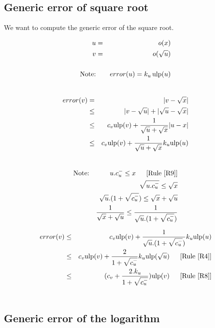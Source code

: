 \documentclass[12pt]{amsart}
\def\ulp{{\rm ulp}}
\newcommand{\U}[1]{\quad \mbox{[Rule~\ref{#1}]}}
\begin{document}
\subsection{Generic error of square root}\label{generic:sqrt}


We want to compute the generic error of the square root.

\begin{eqnarray}\nonumber
u&=&o(x) \\\nonumber
v&=&o(\sqrt{u}) \\\nonumber
&&\\\nonumber
\textnormal{Note:}&& error(u) = k_u \, \ulp(u)\\\nonumber
\end{eqnarray}


\begin{eqnarray}\nonumber
error(v)& = &|v - \sqrt{x}| \\\nonumber
& \leq &|v - \sqrt{u}| +|\sqrt{u} - \sqrt{x}| \\\nonumber
& \leq & c_v \ulp(v) + \frac{1}{\sqrt{u} + \sqrt{x}}|u-x| \\\nonumber
& \leq & c_v \ulp(v) + \frac{1}{\sqrt{u} + \sqrt{x}} k_u \ulp(u) \\\nonumber
\end{eqnarray}



\begin{eqnarray}\nonumber
\textnormal{Note:}&& u.c_u^- \leq x \;\; \U{R9}\\\nonumber
 && \sqrt{u.c_u^-} \leq \sqrt{x} \\\nonumber 
 && \sqrt{u}.(1+\sqrt{c_u^-}) \leq \sqrt{x}+\sqrt{u} \\\nonumber 
 && \frac{1}{\sqrt{x}+\sqrt{u}} \leq
    \frac{1}{\sqrt{u}.(1+\sqrt{c_u^-})} 
\end{eqnarray}

\begin{eqnarray}\nonumber
error(v)& \leq & c_v \ulp(v) + 
                 \frac{1}{\sqrt{u}.(1+\sqrt{c_u^-})}  k_u \ulp(u) \\\nonumber 
& \leq & c_v \ulp(v) + \frac{2}{1+\sqrt{c_u^-}}  
       k_u \ulp(\sqrt{u}) \;\; \U{R4}\\\nonumber 
& \leq & (c_v + \frac{2.k_u}{1+\sqrt{c_u^-}})  \ulp(v) \;\; \U{R8}\\\nonumber 
\end{eqnarray}

\subsection{Generic error of the logarithm }\label{generic:log}
\end{document}
